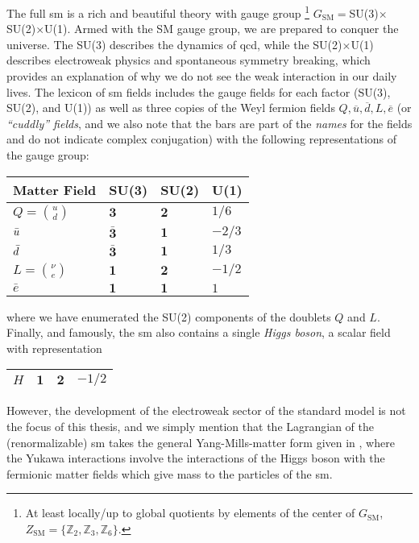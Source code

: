 The full \gls{sm} is a rich and beautiful theory with gauge group%
\footnote{
    At least locally/up to global quotients by elements of the center of \(G_\text{SM}\), \(Z_\text{SM} = \{\mathbb{Z}_2, \mathbb{Z}_3, \mathbb{Z}_6\}\).
}
%
\(G_\text{SM}=\)SU(3)\(\times\)SU(2)\(\times\)U(1).
%
Armed with the SM gauge group, we are prepared to conquer the universe.
%
The SU(3) describes the dynamics of \gls{qcd}, while the SU(2)\(\times\)U(1) describes electroweak physics and spontaneous symmetry breaking, which provides an explanation of why we do not see the weak interaction in our daily lives.
%
The lexicon of \gls{sm} fields includes the gauge fields for each factor (SU(3), SU(2), and U(1)) as well as three copies of the Weyl fermion fields \(Q,\overline{u},\overline{d},L,\overline{e}\) (or \textit{``cuddly'' fields}, and we also note that the bars are part of the \textit{names} for the fields and do not indicate complex conjugation) with the following representations of the gauge group:
\begin{center}
 \begin{tabular}{ |p{3cm}||p{3cm}|p{3cm}|p{3cm}|  }
 \hline
 Matter Field & SU(3) & SU(2) & U(1)\\
 \hline\hline
 \(Q = \binom{u}{d}\) & \(\mathbf{3}\)       & \(\mathbf{2}\) & \(1/6\)  \\
 \(\Bar{u}\)          & \(\bar{\mathbf{3}}\) & \(\mathbf{1}\) & \(-2/3\) \\
 \(\Bar{d}\)          & \(\bar{\mathbf{3}}\) & \(\mathbf{1}\) & \(1/3\)  \\
 \(L = \binom{\nu}{e}\) & \(\mathbf{1}\)       & \(\mathbf{2}\) & \(-1/2\) \\
 \(\bar{e}\) & \(\mathbf{1}\)       & \(\mathbf{1}\) & \(1\)            \\
 \hline
\end{tabular}
\end{center}
where we have enumerated the SU(2) components of the doublets \(Q\) and \(L\).
%
Finally, and famously, the \gls{sm} also contains a single \textit{Higgs boson}, a scalar field with representation
\begin{center}
 \begin{tabular}{ |p{3cm}||p{3cm}|p{3cm}|p{3cm}|  }
 \hline
 \(H\)       & \(\mathbf{1}\)       & \(\mathbf{2}\) & \(-1/2\) \\
 \hline
\end{tabular}
\end{center}
However, the development of the electroweak sector of the standard model is not the focus of this thesis, and we simply mention that the Lagrangian of the (renormalizable) \gls{sm} takes the general Yang-Mills-matter form given in , where the Yukawa interactions involve the interactions of the Higgs boson with the fermionic matter fields which give mass to the particles of the \gls{sm}.


